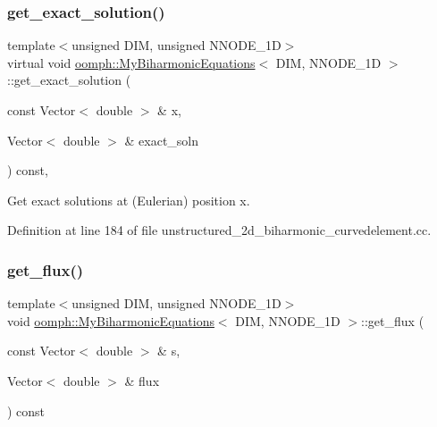\subsubsection{\texorpdfstring{get\+\_\+exact\+\_\+solution()}{get\_exact\_solution()}}
{\footnotesize\ttfamily template$<$unsigned D\+IM, unsigned N\+N\+O\+D\+E\+\_\+1D$>$ \\
virtual void \hyperlink{classoomph_1_1MyBiharmonicEquations}{oomph\+::\+My\+Biharmonic\+Equations}$<$ D\+IM, N\+N\+O\+D\+E\+\_\+1D $>$\+::get\+\_\+exact\+\_\+solution (\begin{DoxyParamCaption}\item[{const Vector$<$ double $>$ \&}]{x,  }\item[{Vector$<$ double $>$ \&}]{exact\+\_\+soln }\end{DoxyParamCaption}) const\hspace{0.3cm}{\ttfamily [inline]}, {\ttfamily [virtual]}}



Get exact solutions at (Eulerian) position x. 



Definition at line 184 of file unstructured\+\_\+2d\+\_\+biharmonic\+\_\+curvedelement.\+cc.

\mbox{\label{classoomph_1_1MyBiharmonicEquations_a3178c1126ec2e6dec0bc3ff66af0b05e}} 
\subsubsection{\texorpdfstring{get\+\_\+flux()}{get\_flux()}}
{\footnotesize\ttfamily template$<$unsigned D\+IM, unsigned N\+N\+O\+D\+E\+\_\+1D$>$ \\
void \hyperlink{classoomph_1_1MyBiharmonicEquations}{oomph\+::\+My\+Biharmonic\+Equations}$<$ D\+IM, N\+N\+O\+D\+E\+\_\+1D $>$\+::get\+\_\+flux (\begin{DoxyParamCaption}\item[{const Vector$<$ double $>$ \&}]{s,  }\item[{Vector$<$ double $>$ \&}]{flux }\end{DoxyParamCaption}) const\hspace{0.3cm}{\ttfamily [inline]}}



